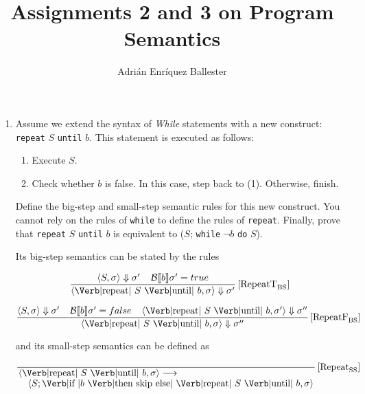 \documentclass{article}
\title{Assignments 2 and 3 on Program Semantics}
\author{Adrián Enríquez Ballester}
\begin{document}
\maketitle

\begin{enumerate}[2.]
  \item Assume we extend the syntax of \textit{While} statements
    with a new construct: \verb|repeat| $S$ \verb|until| $b$. 
    This statement is executed as follows:

    \begin{enumerate}[(1)]
      \item Execute $S$.
      \item Check whether $b$ is false. In this case, step back
        to (1). Otherwise, finish.
    \end{enumerate}

    Define the big-step and small-step semantic rules for this 
    new construct. You cannot rely on the rules of \verb|while|
    to define the rules of \verb|repeat|. Finally, prove that
    \verb|repeat| $S$ \verb|until| $b$ is equivalent to 
    ($S$; \verb|while| $\neg b$ \verb|do| $S$).

    Its big-step semantics can be stated by the rules

    $$
    \frac
      {
        \langle S, \sigma \rangle \Downarrow \sigma' \;\;\;\;
        \mathcal{B}\llbracket b \rrbracket \sigma' = true
      }
      {
        \langle 
          \text{\Verb|repeat| } S \text{ \Verb|until| } b,
          \sigma
        \rangle \Downarrow \sigma'
      }
    \left[\text{RepeatT}_\text{BS}\right]
    $$

    $$
    \frac
      {
        \langle S, \sigma \rangle \Downarrow \sigma' \;\;\;\;
        \mathcal{B}\llbracket b \rrbracket \sigma' = false \;\;\;\;
        \langle 
          \text{\Verb|repeat| } S \text{ \Verb|until| } b,
          \sigma'
        \rangle \Downarrow \sigma''
      }
      {
        \langle 
          \text{\Verb|repeat| } S \text{ \Verb|until| } b,
          \sigma
        \rangle \Downarrow \sigma''
      }
    \left[\text{RepeatF}_\text{BS}\right]
    $$

    and its small-step semantics can be defined as

    $$
    \frac
      {
      }
      {
      \splitfrac{
        \langle 
          \text{\Verb|repeat| } S \text{ \Verb|until| } b,
          \sigma
        \rangle \longrightarrow
      }
      {
        \langle 
          S;
          \text{\Verb|if |} b \text{ \Verb|then skip else| } 
          \text{\Verb|repeat| } S \text{ \Verb|until| } b,
          \sigma
        \rangle
      }
      }
    \left[\text{Repeat}_\text{SS}\right]
    $$


\end{enumerate}
\end{document}
